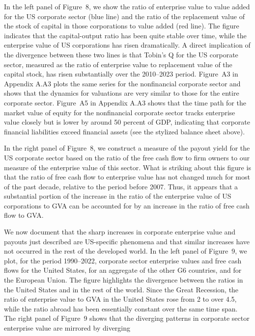 \documentclass[11pt]{article}
\begin{document}
In the left panel of Figure 8, we show the ratio of enterprise value to value added for the US corporate sector (blue line) and the ratio of the replacement value of the stock of capital in those corporations to value added (red line). The figure indicates that the capital-output ratio has been quite stable over time, while the enterprise value of US corporations has risen dramatically. A direct implication of the divergence between these two lines is that Tobin’s Q for the US corporate sector, measured as the ratio of enterprise value to replacement value of the capital stock, has risen substantially over the 2010–2023 period. Figure A3 in Appendix A.A3 plots the same series for the nonfinancial corporate sector and shows that the dynamics for valuations are very similar to those for the entire corporate sector. Figure A5 in Appendix A.A3 shows that the time path for the market value of equity for the nonfinancial corporate sector tracks enterprise value closely but is lower by around 50 percent of GDP, indicating that corporate financial liabilities exceed financial assets (see the stylized balance sheet above).


In the right panel of Figure 8, we construct a measure of the payout yield for the US corporate sector based on the ratio of the free cash flow to firm owners to our measure of the enterprise value of this sector. What is striking about this figure is that the ratio of free cash flow to enterprise value has not changed much for most of the past decade, relative to the period before 2007. Thus, it appears that a substantial portion of the increase in the ratio of the enterprise value of US corporations to GVA can be accounted for by an increase in the ratio of free cash flow to GVA.


We now document that the sharp increases in corporate enterprise value and payouts just described are US-specific phenomena and that similar increases have not occurred in the rest of the developed world. In the left panel of Figure 9, we plot, for the period 1990–2022, corporate sector enterprise values and free cash flows for the United States, for an aggregate of the other G6 countries, and for the European Union. The figure highlights the divergence between the ratios in the United States and in the rest of the world. Since the Great Recession, the ratio of enterprise value to GVA in the United States rose from 2 to over 4.5, while the ratio abroad has been essentially constant over the same time span. The right panel of Figure 9 shows that the diverging patterns in corporate sector enterprise value are mirrored by diverging
\end{document}
